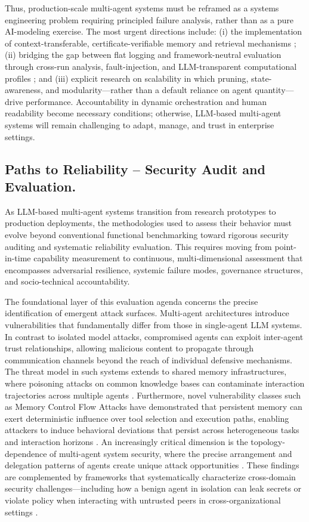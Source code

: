 \documentclass[11pt,a4paper]{article}
\begin{document}
Thus, production-scale multi-agent systems must be reframed as a systems engineering problem requiring principled failure analysis, rather than as a pure AI-modeling exercise. The most urgent directions include: (i) the implementation of context-transferable, certificate-verifiable memory and retrieval mechanisms \cite{arxiv:2603.10062v2}; (ii) bridging the gap between flat logging and framework-neutral evaluation through cross-run analysis, fault-injection, and LLM-transparent computational profiles \cite{arxiv:2503.13553v2,arxiv:2506.12508v6}; and (iii) explicit research on scalability in which pruning, state-awareness, and modularity---rather than a default reliance on agent quantity---drive performance. Accountability in dynamic orchestration and human readability become necessary conditions; otherwise, LLM-based multi-agent systems will remain challenging to adapt, manage, and trust in enterprise settings.


\subsection{Paths to Reliability -- Security Audit and Evaluation.}


As LLM-based multi-agent systems transition from research prototypes to production deployments, the methodologies used to assess their behavior must evolve beyond conventional functional benchmarking toward rigorous security auditing and systematic reliability evaluation. This requires moving from point-in-time capability measurement to continuous, multi-dimensional assessment that encompasses adversarial resilience, systemic failure modes, governance structures, and socio-technical accountability.

The foundational layer of this evaluation agenda concerns the precise identification of emergent attack surfaces. Multi-agent architectures introduce vulnerabilities that fundamentally differ from those in single-agent LLM systems. In contrast to isolated model attacks, compromised agents can exploit inter-agent trust relationships, allowing malicious content to propagate through communication channels beyond the reach of individual defensive mechanisms. The threat model in such systems extends to shared memory infrastructures, where poisoning attacks on common knowledge bases can contaminate interaction trajectories across multiple agents \cite{arxiv:2505.16067v2}. Furthermore, novel vulnerability classes such as Memory Control Flow Attacks have demonstrated that persistent memory can exert deterministic influence over tool selection and execution paths, enabling attackers to induce behavioral deviations that persist across heterogeneous tasks and interaction horizons \cite{arxiv:2603.15125v3}. An increasingly critical dimension is the topology-dependence of multi-agent system security, where the precise arrangement and delegation patterns of agents create unique attack opportunities \cite{arxiv:2505.23352v1}. These findings are complemented by frameworks that systematically characterize cross-domain security challenges---including how a benign agent in isolation can leak secrets or violate policy when interacting with untrusted peers in cross-organizational settings \cite{arxiv:2505.23847v5}.
\end{document}
